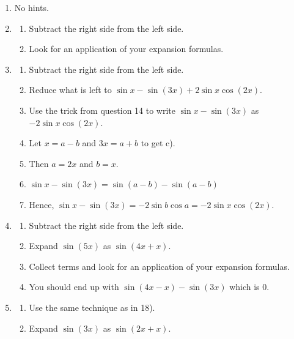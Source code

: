 \documentclass[english]{book}
\begin{document}
\begin{enumerate}
\begin{enumerate}
        \item No hints.
        \item \begin{enumerate}[\hspace{1cm}a)]
                \item Subtract the right side from the left side.
                \item Look for an application of your expansion formulas.
              \end{enumerate}
        \item \begin{enumerate}[\hspace{1cm}a)]
                \item Subtract the right side from the left side.
                \item Reduce what is left to $\sin x - \sin(3x) +2 \sin x  \cos(2x)$.
                \item Use the trick from question 14 to write $\sin x - \sin(3x)$ as
                   \\ $- 2 \sin x \cos(2x)$.
                \item Let $x=a-b$ and $3x=a+b$ to get c).
                \item Then $a=2x$ and $b=x$.
                \item $\sin x - \sin(3x) = \sin(a-b) - \sin(a-b)$
                \item Hence, $\sin x - \sin(3x)=-2 \sin b \cos a = -2 \sin x  \cos(2x)$.
              \end{enumerate}
        \item \begin{enumerate}[\hspace{1cm}a)]
                \item Subtract the right side from the left side.
                \item Expand $\sin(5x)$ as $\sin(4x+x)$.
                \item Collect terms and look for an application of your expansion formulas.
                \item You should end up with $\sin(4x-x) - \sin(3x)$ which is $0$.
              \end{enumerate}
        \item \begin{enumerate}[\hspace{1cm}a)]
                \item Use the same technique as in 18).
                \item Expand $\sin(3x)$ as $\sin(2x+x)$.

\end{enumerate}
\end{enumerate}
\end{enumerate}
\end{document}
